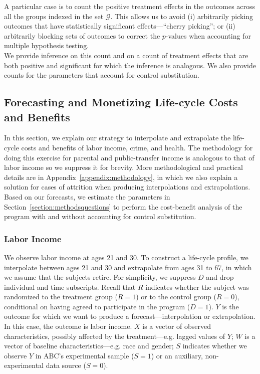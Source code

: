 \noindent A particular case is to count the positive treatment effects in the outcomes across all the groups indexed in the set $\mathcal{G}$. This allows us to avoid (i) arbitrarily picking outcomes that have statistically significant effects---``cherry picking''; or (ii) arbitrarily blocking sets of outcomes to correct the $p$-values when accounting for multiple hypothesis testing.\\

\noindent We provide inference on this count and on a count of treatment effects that are both positive and significant for which the inference is analogous. We also provide counts for the parameters that account for control substitution.

\subsection{Forecasting and Monetizing Life-cycle Costs and Benefits} \label{section:cbamethodology}

\noindent In this section, we explain our strategy to interpolate and extrapolate the life-cycle costs and benefits of labor income, crime, and health. The methodology for doing this exercise for parental and public-transfer income is analogous to that of labor income so we suppress it for brevity. More methodological and practical details are in Appendix~\ref{appendix:methodology}, in which we also explain a solution for cases of attrition when producing interpolations and extrapolations. Based on our forecasts, we estimate the parameters in Section~\ref{section:methodsquestions} to perform the cost-benefit analysis of the program with and without accounting for control substitution.

\subsubsection{Labor Income}

\noindent We observe labor income at ages 21 and 30. To construct a life-cycle profile, we interpolate between ages 21 and 30 and extrapolate from ages 31 to 67, in which we assume that the subjects retire. For simplicity, we suppress $D$ and drop individual and time subscripts. Recall that $R$ indicates whether the subject was randomized to the treatment group ($R=1$) or to the control group ($R=0$), conditional on having agreed to participate in the program ($D = 1$). $Y$ is the outcome for which we want to produce a forecast---interpolation or extrapolation. In this case, the outcome is labor income. $X$ is a vector of observed characteristics, possibly affected by the treatment---e.g. lagged values of $Y$; $W$ is a vector of baseline characteristics---e.g. race and gender; $S$ indicates whether we observe $Y$ in ABC's experimental sample ($S=1$) or an auxiliary, non-experimental data source ($S=0$).\\

